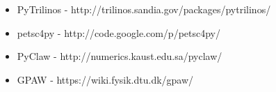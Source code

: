 \documentclass{article}
\begin{document}
\begin{itemize}
\itemsep1pt\parskip0pt
\item
  PyTrilinos - http://trilinos.sandia.gov/packages/pytrilinos/
\item
  petsc4py - http://code.google.com/p/petsc4py/
\item
  PyClaw - http://numerics.kaust.edu.sa/pyclaw/
\item
  GPAW - https://wiki.fysik.dtu.dk/gpaw/
\end{itemize}


    
    
    
    
\end{document}
